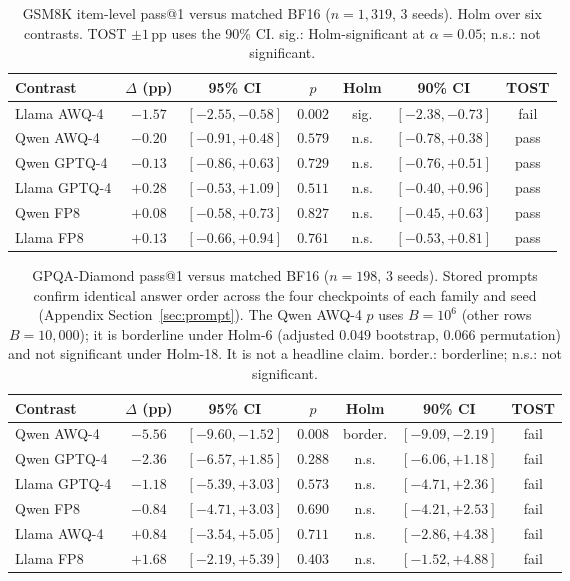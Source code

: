 \documentclass[11pt,a4paper]{article}
\begin{document}
\begin{table}[!htbp]
\centering
\caption{GSM8K item-level pass@1 versus matched BF16 ($n=1{,}319$, 3 seeds). Holm over six contrasts. TOST $\pm 1$\,pp uses the 90\% CI. sig.: Holm-significant at $\alpha=0.05$; n.s.: not significant.}
\label{tab:gsm-contrasts}
\small
\begin{tabular}{lcccccc}
\toprule
\textbf{Contrast} & $\Delta$ (pp) & \textbf{95\% CI} & $p$ & \textbf{Holm} & \textbf{90\% CI} & \textbf{TOST} \\
\midrule
Llama AWQ-4  & $-1.57$ & $[-2.55,-0.58]$ & $0.002$ & sig. & $[-2.38,-0.73]$ & fail \\
Qwen AWQ-4   & $-0.20$ & $[-0.91,+0.48]$ & $0.579$ & n.s. & $[-0.78,+0.38]$ & pass \\
Qwen GPTQ-4  & $-0.13$ & $[-0.86,+0.63]$ & $0.729$ & n.s. & $[-0.76,+0.51]$ & pass \\
Llama GPTQ-4 & $+0.28$ & $[-0.53,+1.09]$ & $0.511$ & n.s. & $[-0.40,+0.96]$ & pass \\
Qwen FP8     & $+0.08$ & $[-0.58,+0.73]$ & $0.827$ & n.s. & $[-0.45,+0.63]$ & pass \\
Llama FP8    & $+0.13$ & $[-0.66,+0.94]$ & $0.761$ & n.s. & $[-0.53,+0.81]$ & pass \\
\bottomrule
\end{tabular}
\end{table}

\begin{table}[!htbp]
\centering
\caption{GPQA-Diamond pass@1 versus matched BF16 ($n=198$, 3 seeds). Stored prompts confirm identical answer order across the four checkpoints of each family and seed (Appendix Section~\ref{sec:prompt}). The Qwen AWQ-4 $p$ uses $B=10^6$ (other rows $B=10{,}000$); it is borderline under Holm-6 (adjusted $0.049$ bootstrap, $0.066$ permutation) and not significant under Holm-18. It is not a headline claim. border.: borderline; n.s.: not significant.}
\label{tab:gpqa-contrasts}
\small
\begin{tabular}{lcccccc}
\toprule
\textbf{Contrast} & $\Delta$ (pp) & \textbf{95\% CI} & $p$ & \textbf{Holm} & \textbf{90\% CI} & \textbf{TOST} \\
\midrule
Qwen AWQ-4   & $-5.56$ & $[-9.60,-1.52]$ & $0.008$ & border. & $[-9.09,-2.19]$ & fail \\
Qwen GPTQ-4  & $-2.36$ & $[-6.57,+1.85]$ & $0.288$ & n.s. & $[-6.06,+1.18]$ & fail \\
Llama GPTQ-4 & $-1.18$ & $[-5.39,+3.03]$ & $0.573$ & n.s. & $[-4.71,+2.36]$ & fail \\
Qwen FP8     & $-0.84$ & $[-4.71,+3.03]$ & $0.690$ & n.s. & $[-4.21,+2.53]$ & fail \\
Llama AWQ-4  & $+0.84$ & $[-3.54,+5.05]$ & $0.711$ & n.s. & $[-2.86,+4.38]$ & fail \\
Llama FP8    & $+1.68$ & $[-2.19,+5.39]$ & $0.403$ & n.s. & $[-1.52,+4.88]$ & fail \\
\bottomrule
\end{tabular}
\end{table}
\end{document}
